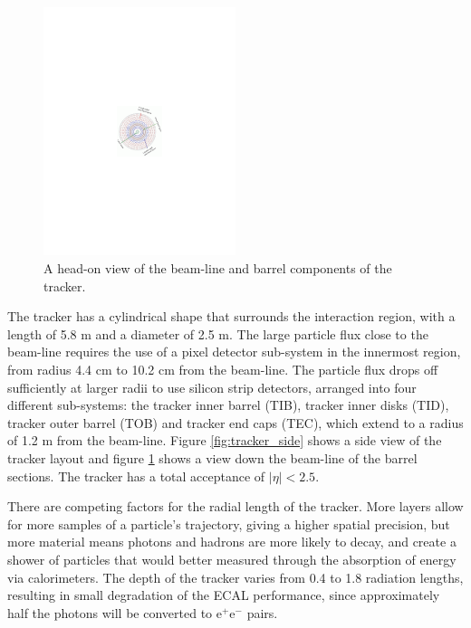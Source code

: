 \begin{figure}[h]
   \centering
  \includegraphics[width=0.5\textwidth]{Figures/CMS_Diagrams/Tracker__Barrel_View.pdf}
  \caption{A head-on view of the beam-line and barrel components of the
  tracker.} \label{fig:tracker_barrel}
\end{figure}

\par The tracker has a cylindrical shape that surrounds the interaction 
region, with a length of 5.8 m and a diameter of 2.5 m.  The large
particle flux close to the beam-line requires the use of a pixel
detector sub-system in the innermost region, from radius 4.4 cm to
10.2 cm from the beam-line.  The particle flux drops off sufficiently at
larger radii to use silicon strip detectors, arranged into four
different sub-systems: the tracker inner barrel (TIB), tracker inner
disks (TID), tracker outer barrel (TOB) and tracker end caps (TEC),
which extend to a radius of 1.2 m from the beam-line.  Figure
\ref{fig:tracker_side} shows a side view of the tracker layout and
figure \ref{fig:tracker_barrel} shows a view down the beam-line of the
barrel sections.  The tracker has a total acceptance of $|\eta|<2.5$.  

\par There are competing factors for the radial length of the
tracker.  More layers allow for more samples of a particle's
trajectory, giving a higher spatial precision, but more material means
photons and hadrons are more likely to decay, and create a shower of
particles that would better measured through the absorption of
energy via calorimeters. The depth of the tracker varies from 0.4 to
1.8 radiation lengths, resulting in small degradation of the ECAL
performance, since approximately half the photons will be converted to
e$^{+}$e$^{-}$ pairs.   

